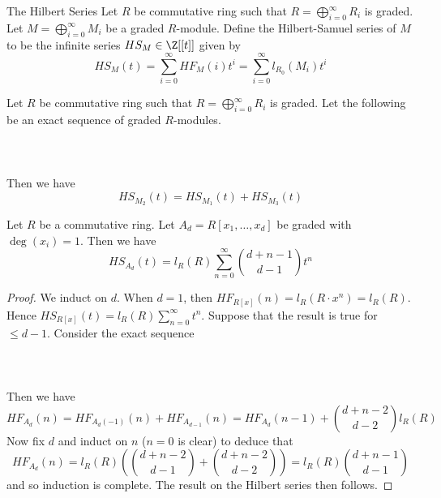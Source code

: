 \documentclass[a4paper]{article}
\begin{document}
\begin{defn}{The Hilbert Series}{} Let $R$ be commutative ring such that $R=\bigoplus_{i=0}^\infty R_i$ is graded. Let $M=\bigoplus_{i=0}^\infty M_i$ be a graded $R$-module. Define the Hilbert-Samuel series of $M$ to be the infinite series $HS_M\in\Z[[t]]$ given by $$HS_M(t)=\sum_{i=0}^\infty HF_M(i)t^i=\sum_{i=0}^\infty l_{R_0}(M_i)t^i$$
\end{defn}

\begin{prp}{}{} Let $R$ be commutative ring such that $R=\bigoplus_{i=0}^\infty R_i$ is graded. Let the following be an exact sequence of graded $R$-modules. \\~\\
\\~\\
Then we have $$HS_{M_2}(t)=HS_{M_1}(t)+HS_{M_3}(t)$$
\end{prp}

\begin{eg}{}{} Let $R$ be a commutative ring. Let $A_d=R[x_1,\dots,x_d]$ be graded with $\deg(x_i)=1$. Then we have $$HS_{A_d}(t)=l_R(R)\sum_{n=0}^\infty\binom{d+n-1}{d-1}t^n$$ \tcbline
\begin{proof}
We induct on $d$. When $d=1$, then $HF_{R[x]}(n)=l_R(R\cdot x^n)=l_R(R)$. Hence $HS_{R[x]}(t)=l_R(R)\sum_{n=0}^\infty t^n$. Suppose that the result is true for $\leq d-1$. Consider the exact sequence \\~\\
\\~\\
Then we have $$HF_{A_d}(n)=HF_{A_d(-1)}(n)+HF_{A_{d-1}}(n)=HF_{A_d}(n-1)+\binom{d+n-2}{d-2}l_R(R)$$ Now fix $d$ and induct on $n$ ($n=0$ is clear) to deduce that $$HF_{A_d}(n)=l_R(R)\left(\binom{d+n-2}{d-1}+\binom{d+n-2}{d-2}\right)=l_R(R)\binom{d+n-1}{d-1}$$ and so induction is complete. The result on the Hilbert series then follows. 
\end{proof}
\end{eg}
\end{document}
